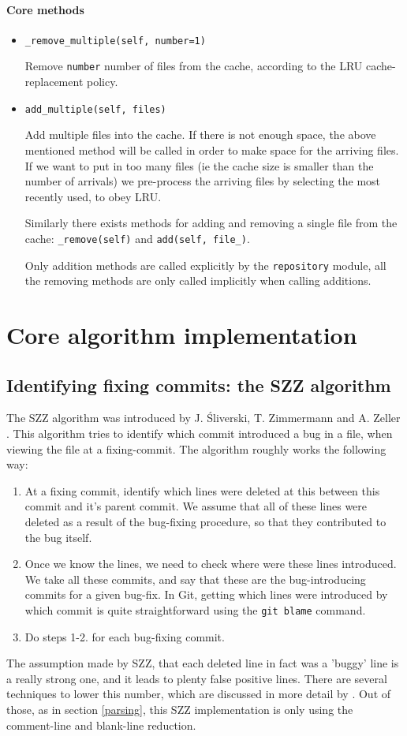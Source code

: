\documentclass[12pt,twoside,notitlepage]{report}
\begin{document}
\paragraph{Core methods}
\begin{itemize}
\item \texttt{\_remove\_multiple(self, number=1)} 

Remove \texttt{number} number of files from the cache, according to the LRU cache-replacement policy.

\item \texttt{add\_multiple(self, files)}

Add multiple files into the cache. If there is not enough space,  the above mentioned method will be called in order to make space for the arriving files. If we want to put in too many files (ie the cache size is smaller than the number of arrivals) we pre-process the arriving files by selecting the most recently used, to obey LRU.

Similarly there exists methods for adding and removing a single file from the cache: \texttt{\_remove(self)} and \texttt{add(self, file\_)}. 

Only addition methods are called explicitly by the \texttt{repository} module, all the removing methods are only called implicitly when calling additions.

\end{itemize}
\section{Core algorithm implementation}
\subsection{Identifying fixing commits: the SZZ algorithm}
The SZZ algorithm was introduced by J. \'Sliverski, T. Zimmermann and A. Zeller \cite{SZZ}. This algorithm tries to identify which commit introduced a bug in a file, when viewing the file at a fixing-commit. The algorithm roughly works the following way:
\begin{enumerate}
\item At a fixing commit, identify which lines were deleted at this between this commit and it's parent commit. We assume that all of these lines were deleted as a result of the bug-fixing procedure, so that they contributed to the bug itself.
\item Once we know the lines, we need to check where were these lines introduced. We take all these commits, and say that these are the bug-introducing commits for a given bug-fix. In Git, getting which lines were introduced by which commit is quite straightforward using the \texttt{git blame} command.
\item Do steps 1-2. for each bug-fixing commit.
\end{enumerate}
The assumption made by SZZ, that each deleted line in fact was a 'buggy' line is a really strong one, and it leads to plenty false positive lines. There are several techniques to lower this number, which are discussed in more detail by \cite{KimZim}. Out of those, as in section \ref{parsing}, this SZZ implementation is only using the comment-line and blank-line reduction.
\end{document}
